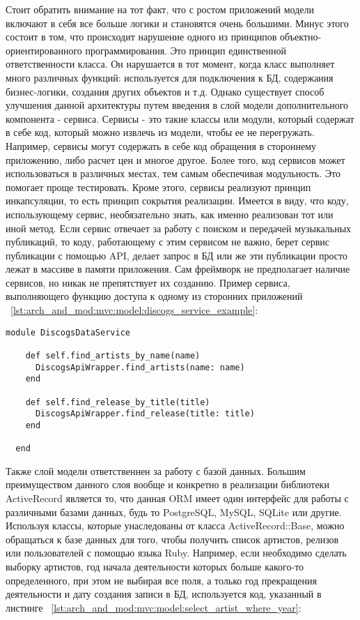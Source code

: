 Стоит обратить внимание на тот факт, что с ростом приложений модели включают в себя все больше логики и становятся очень большими. Минус этого состоит в том, что происходит нарушение одного из принципов объектно-ориентированного программирования. Это принцип единственной ответственности класса. Он нарушается в тот момент, когда класс выполняет много различных функций: используется для подключения к БД, содержания бизнес-логики, создания других объектов и т.д. Однако существует способ улучшения данной архитектуры путем введения в слой модели дополнительного компонента - сервиса. Сервисы - это такие классы или модули, который содержат в себе код, который можно извлечь из модели, чтобы ее не перегружать. Например, сервисы могут содержать в себе код обращения в стороннему приложению, либо расчет цен и многое другое. Более того, код сервисов может использоваться в различных местах, тем самым обеспечивая модульность. Это помогает проще тестировать. Кроме этого, сервисы реализуют принцип инкапсуляции, то есть принцип сокрытия реализации. Имеется в виду, что коду, использующему сервис, необязательно знать, как именно реализован тот или иной метод. Если сервис отвечает за работу с поиском и передачей музыкальных публикаций, то коду, работающему с этим сервисом не важно, берет сервис публикации с помощью API, делает запрос в БД или же эти публикации просто лежат в массиве в памяти приложения. Сам фреймворк не предполагает наличие сервисов, но никак не препятствует их созданию. Пример сервиса, выполняющего функцию доступа к одному из сторонних приложений ~\ref{lst:arch_and_mod:mvc:model:discogs_service_example}:

\begin{lstlisting}[style=fsharpstyle,caption={Пример получения артистов по определенным параметрам}, label=lst:arch_and_mod:mvc:model:discogs_service_example]
  module DiscogsDataService

    def self.find_artists_by_name(name)
      DiscogsApiWrapper.find_artists(name: name)
    end

    def self.find_release_by_title(title)
      DiscogsApiWrapper.find_release(title: title)
    end

  end
\end{lstlisting}

Также слой модели ответственнен за работу с базой данных. Большим преимуществом данного слоя вообще и конкретно в реализации библиотеки ActiveRecord является то, что данная ORM имеет один интерфейс для работы с различными базами данных, будь то PostgreSQL, MySQL, SQLite или другие. Используя классы, которые унаследованы от класса ActiveRecord::Base, можно обращаться к базе данных для того, чтобы получить список артистов, релизов или пользователей с помощью языка Ruby. Например, если необходимо сделать выборку артистов, год начала деятельности которых больше какого-то определенного, при этом не выбирая все поля, а только год прекращения деятельности и дату создания записи в БД, используется код, указанный в листинге ~\ref{lst:arch_and_mod:mvc:model:select_artist_where_year}:

